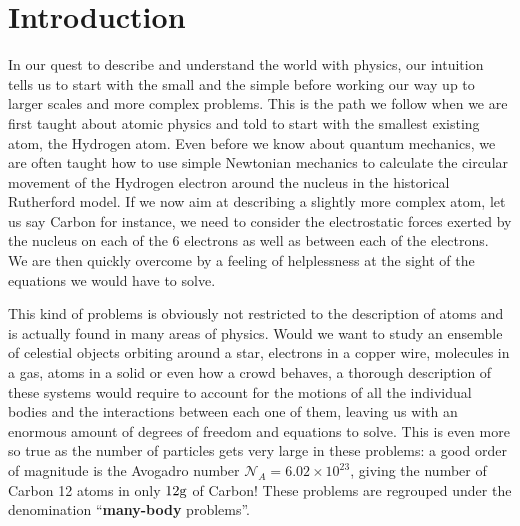 \chapter*{Introduction}

\label{chap:intro}





In our quest to describe and understand the world with physics, our intuition tells us to start with the small and the simple before working our way up to larger scales and more complex problems. This is the path we follow when we are first taught about atomic physics and told to start with the smallest existing atom, the Hydrogen atom. Even before we know about quantum mechanics, we are often taught how to use simple Newtonian mechanics to calculate the circular movement of the Hydrogen electron around the nucleus in the historical Rutherford model. If we now aim at describing a slightly more complex atom, let us say Carbon for instance, we need to consider the electrostatic forces exerted by the nucleus on each of the 6 electrons as well as between each of the electrons. We are then quickly overcome by a feeling of helplessness at the sight of the equations we would have to solve.


This kind of problems is obviously not restricted to the description of atoms and is actually found in many areas of physics. Would we want to study an ensemble of celestial objects orbiting around a star, electrons in a copper wire, molecules in a gas, atoms in a solid or even how a crowd behaves, a thorough description of these systems would require to account for the motions of all the individual bodies and the interactions between each one of them, leaving us with an enormous amount of degrees of freedom and equations to solve. This is even more so true as the number of particles gets very large in these problems: a good order of magnitude is the Avogadro number $\mathcal{N}_A = 6.02 \times 10^{23}$, giving the number of Carbon 12 atoms in only $12\rm{g}$ of Carbon! These problems are regrouped under the denomination ``\textbf{many-body} problems''. 


